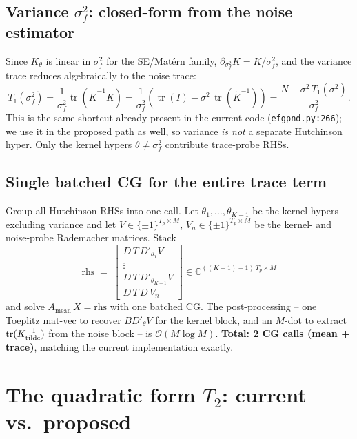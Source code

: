 \documentclass[11pt]{article}
\newcommand{\tr}{\operatorname{tr}}
\newcommand{\bigo}{\mathcal{O}}
\newcommand{\Ktil}{\widetilde K}
\begin{document}
\subsection{Variance $\sigma_f^2$: closed-form from the noise estimator}
\label{sec:var-shortcut}

Since $K_\theta$ is linear in $\sigma_f^2$ for the SE/Mat\'ern family,
$\partial_{\sigma_f^2}K = K/\sigma_f^2$, and the variance trace reduces algebraically to the noise trace:
\begin{equation}
  T_1(\sigma_f^2) = \frac{1}{\sigma_f^2}\tr(\Ktil^{-1}K) = \frac{1}{\sigma_f^2}\!\left(\tr(I) - \sigma^2\,\tr(\Ktil^{-1})\right)
                  = \frac{N - \sigma^2\, T_1(\sigma^2)}{\sigma_f^2}.
\end{equation}
This is the same shortcut already present in the current code (\texttt{efgpnd.py:266}); we use it in the proposed path as well, so variance \emph{is not} a separate Hutchinson hyper. Only the kernel hypers $\theta\ne\sigma_f^2$ contribute trace-probe RHSs.

\subsection{Single batched CG for the entire trace term}
\label{sec:single-cg}

Group all Hutchinson RHSs into one call. Let $\theta_1,\dots,\theta_{K-1}$ be the kernel hypers excluding variance and let $V\in\{\pm1\}^{T_p\times M}$, $V_n\in\{\pm1\}^{T_p\times M}$ be the kernel- and noise-probe Rademacher matrices. Stack
\begin{equation}
  \mathrm{rhs} \;=\; \begin{bmatrix} D\,T\,D'_{\theta_1} V \\[2pt] \vdots \\[2pt] D\,T\,D'_{\theta_{K-1}} V \\[2pt] D\,T\,D\,V_n \end{bmatrix} \in \mathbb{C}^{((K-1)+1)\,T_p \times M}
\end{equation}
and solve $A_{\text{mean}}\,X = \mathrm{rhs}$ with one batched CG. The post-processing -- one Toeplitz mat-vec to recover $BD'_\theta V$ for the kernel block, and an $M$-dot to extract $\tr(K_{\rm tilde}^{-1})$ from the noise block -- is $\bigo(M\log M)$. \textbf{Total: 2 CG calls (mean + trace)}, matching the current implementation exactly.

\section{The quadratic form $T_2$: current vs.\ proposed}
\end{document}
